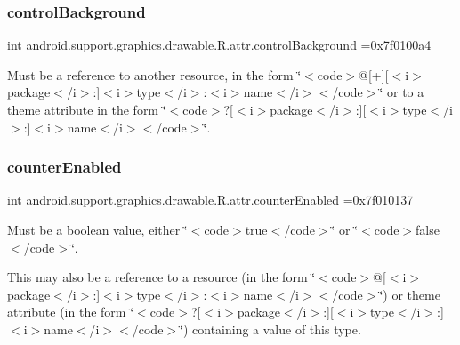 \subsubsection{\texorpdfstring{control\+Background}{controlBackground}}
{\footnotesize\ttfamily int android.\+support.\+graphics.\+drawable.\+R.\+attr.\+control\+Background =0x7f0100a4\hspace{0.3cm}{\ttfamily [static]}}

Must be a reference to another resource, in the form \char`\"{}$<$code$>$@\mbox{[}+\mbox{]}\mbox{[}$<$i$>$package$<$/i$>$\+:\mbox{]}$<$i$>$type$<$/i$>$\+:$<$i$>$name$<$/i$>$$<$/code$>$\char`\"{} or to a theme attribute in the form \char`\"{}$<$code$>$?\mbox{[}$<$i$>$package$<$/i$>$\+:\mbox{]}\mbox{[}$<$i$>$type$<$/i$>$\+:\mbox{]}$<$i$>$name$<$/i$>$$<$/code$>$\char`\"{}. \mbox{\label{classandroid_1_1support_1_1graphics_1_1drawable_1_1R_1_1attr_a9c0cfdd06cacc115964341d2809ec6cf}} 
\subsubsection{\texorpdfstring{counter\+Enabled}{counterEnabled}}
{\footnotesize\ttfamily int android.\+support.\+graphics.\+drawable.\+R.\+attr.\+counter\+Enabled =0x7f010137\hspace{0.3cm}{\ttfamily [static]}}

Must be a boolean value, either \char`\"{}$<$code$>$true$<$/code$>$\char`\"{} or \char`\"{}$<$code$>$false$<$/code$>$\char`\"{}. 

This may also be a reference to a resource (in the form \char`\"{}$<$code$>$@\mbox{[}$<$i$>$package$<$/i$>$\+:\mbox{]}$<$i$>$type$<$/i$>$\+:$<$i$>$name$<$/i$>$$<$/code$>$\char`\"{}) or theme attribute (in the form \char`\"{}$<$code$>$?\mbox{[}$<$i$>$package$<$/i$>$\+:\mbox{]}\mbox{[}$<$i$>$type$<$/i$>$\+:\mbox{]}$<$i$>$name$<$/i$>$$<$/code$>$\char`\"{}) containing a value of this type. \mbox{\label{classandroid_1_1support_1_1graphics_1_1drawable_1_1R_1_1attr_a16956f62a64eb3c1c1a238892790a5e4}} 
